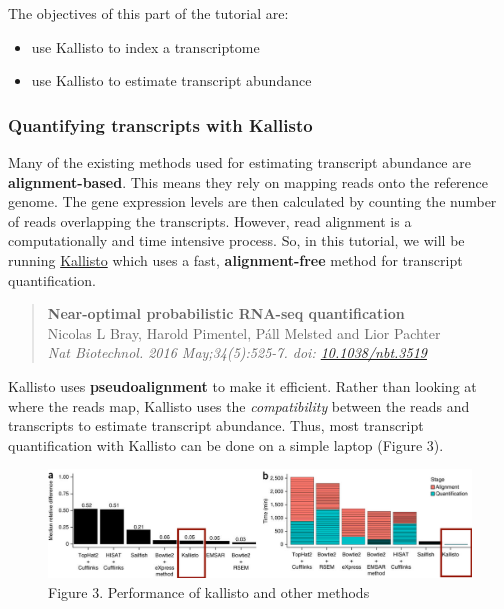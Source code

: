 \documentclass[11pt]{article}
\providecommand{\tightlist}{%
      \setlength{\itemsep}{0pt}\setlength{\parskip}{0pt}}
\begin{document}
The objectives of this part of the tutorial are:

\begin{itemize}
\tightlist
\item
  use Kallisto to index a transcriptome
\item
  use Kallisto to estimate transcript abundance
\end{itemize}

    \hypertarget{quantifying-transcripts-with-kallisto}{%
\subsubsection{Quantifying transcripts with
Kallisto}\label{quantifying-transcripts-with-kallisto}}

Many of the existing methods used for estimating transcript abundance
are \textbf{alignment-based}. This means they rely on mapping reads onto
the reference genome. The gene expression levels are then calculated by
counting the number of reads overlapping the transcripts. However, read
alignment is a computationally and time intensive process. So, in this
tutorial, we will be running
\href{https://pachterlab.github.io/kallisto/}{Kallisto} which uses a
fast, \textbf{alignment-free} method for transcript quantification.

\begin{quote}
\textbf{Near-optimal probabilistic RNA-seq quantification}\\
Nicolas L Bray, Harold Pimentel, Páll Melsted and Lior Pachter\\
\textit{Nat Biotechnol. 2016 May;34(5):525-7. doi:
\href{https://www.nature.com/articles/nbt.3519}{10.1038/nbt.3519}}
\end{quote}

Kallisto uses \textbf{pseudoalignment} to make it
efficient. Rather than looking at where the reads map, Kallisto uses the
\textit{compatibility} between the reads and transcripts to estimate
transcript abundance. Thus, most transcript quantification with Kallisto
can be done on a simple laptop (Figure 3).

    \begin{figure}[!h]
\centering
\includegraphics{images/kallisto-performance.png}
\caption{Figure 3. Performance of kallisto and other methods}
\end{figure}
\end{document}
